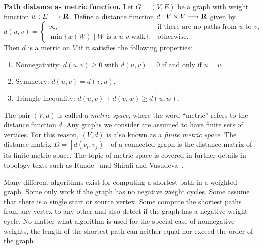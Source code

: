 \begin{lemma}
\label{lem:graph_algorithms:path_distance_metric_function}
\textbf{Path distance as metric function.}
Let $G = (V,E)$ be a graph with weight function
$w: E \longrightarrow \mathbf{R}$. Define a distance function
$d: V \times V \longrightarrow \mathbf{R}$ given by
\[
d(u,v)
=
\begin{cases}
\infty, & \text{if there are no paths from $u$ to $v$}, \\
\min\{w(W) \;|\; \text{$W$ is a $u$-$v$ walk}\}, & \text{otherwise}.
\end{cases}
\]
Then $d$ is a metric on $V$ if it satisfies the
following properties:
\begin{enumerate}
\item Nonnegativity: $d(u,v) \geq 0$ with $d(u,v) = 0$ if and only if
  $u = v$.

\item Symmetry: $d(u,v) = d(v,u)$.

\item Triangle inequality:
  $d(u,v) + d(v,w) \geq d(u,w)$.
\end{enumerate}
\end{lemma}

The pair $(V, d)$ is called a \emph{metric space},
where the word ``metric'' refers to the distance
function $d$. Any graphs we consider are
assumed to have finite sets of vertices. For this reason, $(V,d)$ is
also known as a \emph{finite metric space}.
The distance matrix $D = [d(v_i, v_j)]$ of a
connected graph is the distance matrix of its finite metric
space. The topic of metric space is covered
in further details in topology texts such as
Runde~\cite{Runde2005} and
Shirali and
Vasudeva~\cite{ShiraliVasudeva2006}.

Many different algorithms exist for computing a shortest
path in a weighted graph. Some only work if the
graph has no negative weight cycles. Some assume that there is a
single start or source vertex. Some compute the shortest paths from
any vertex to any other and also detect if the graph has a negative
weight cycle. No matter what algorithm is used
for the special case of nonnegative weights,
the length of the shortest path can neither equal
nor exceed the order of the graph.

